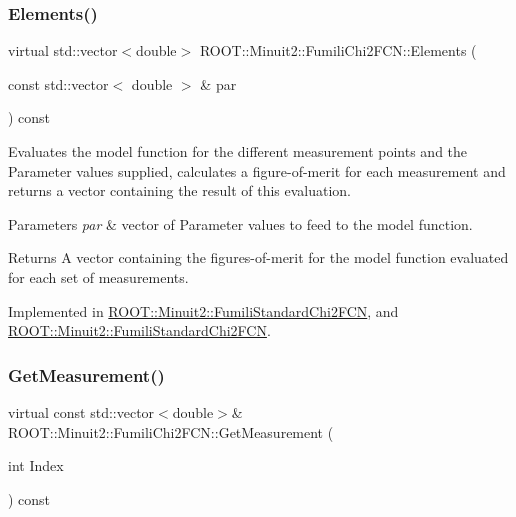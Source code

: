 \subsubsection{\texorpdfstring{Elements()}{Elements()}\hspace{0.1cm}{\footnotesize\ttfamily [2/2]}}
{\footnotesize\ttfamily virtual std\+::vector$<$double$>$ R\+O\+O\+T\+::\+Minuit2\+::\+Fumili\+Chi2\+F\+C\+N\+::\+Elements (\begin{DoxyParamCaption}\item[{const std\+::vector$<$ double $>$ \&}]{par }\end{DoxyParamCaption}) const\hspace{0.3cm}{\ttfamily [pure virtual]}}

Evaluates the model function for the different measurement points and the Parameter values supplied, calculates a figure-\/of-\/merit for each measurement and returns a vector containing the result of this evaluation.


\begin{DoxyParams}{Parameters}
{\em par} & vector of Parameter values to feed to the model function.\\
\hline
\end{DoxyParams}
\begin{DoxyReturn}{Returns}
A vector containing the figures-\/of-\/merit for the model function evaluated for each set of measurements. 
\end{DoxyReturn}


Implemented in \mbox{\hyperlink{classROOT_1_1Minuit2_1_1FumiliStandardChi2FCN_ae7683cdbfa4160902add963d2132ab76}{R\+O\+O\+T\+::\+Minuit2\+::\+Fumili\+Standard\+Chi2\+F\+CN}}, and \mbox{\hyperlink{classROOT_1_1Minuit2_1_1FumiliStandardChi2FCN_ab05d3fe2dcb9b1c56b6753debe5e0064}{R\+O\+O\+T\+::\+Minuit2\+::\+Fumili\+Standard\+Chi2\+F\+CN}}.

\mbox{\label{classROOT_1_1Minuit2_1_1FumiliChi2FCN_a1831875c53596cd4aa52ea536de53b60}} 
\subsubsection{\texorpdfstring{GetMeasurement()}{GetMeasurement()}\hspace{0.1cm}{\footnotesize\ttfamily [1/2]}}
{\footnotesize\ttfamily virtual const std\+::vector$<$double$>$\& R\+O\+O\+T\+::\+Minuit2\+::\+Fumili\+Chi2\+F\+C\+N\+::\+Get\+Measurement (\begin{DoxyParamCaption}\item[{int}]{Index }\end{DoxyParamCaption}) const\hspace{0.3cm}{\ttfamily [pure virtual]}}

